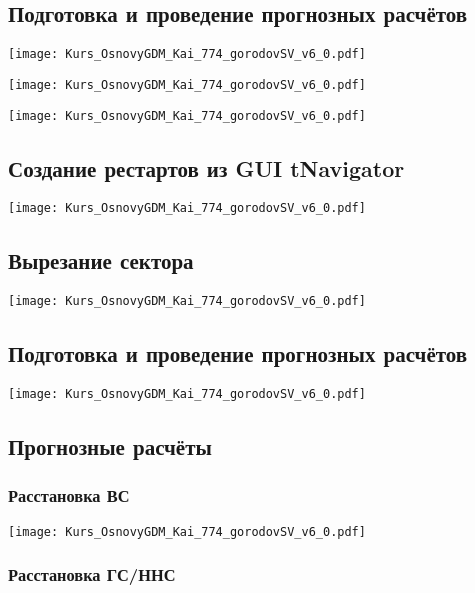 \documentclass[main.tex]{subfiles}
\begin{document}
\subsection{Подготовка и проведение прогнозных расчётов}

\texttt{[image: Kurs\_OsnovyGDM\_Kai\_774\_gorodovSV\_v6\_0.pdf]}

\texttt{[image: Kurs\_OsnovyGDM\_Kai\_774\_gorodovSV\_v6\_0.pdf]}

\texttt{[image: Kurs\_OsnovyGDM\_Kai\_774\_gorodovSV\_v6\_0.pdf]}

\subsection{Создание рестартов из GUI tNavigator}

\texttt{[image: Kurs\_OsnovyGDM\_Kai\_774\_gorodovSV\_v6\_0.pdf]}

\subsection{Вырезание сектора}

\texttt{[image: Kurs\_OsnovyGDM\_Kai\_774\_gorodovSV\_v6\_0.pdf]}

\subsection{Подготовка и проведение прогнозных расчётов}

\texttt{[image: Kurs\_OsnovyGDM\_Kai\_774\_gorodovSV\_v6\_0.pdf]}

\subsection{Прогнозные расчёты}

\subsubsection{Расстановка ВС}

\texttt{[image: Kurs\_OsnovyGDM\_Kai\_774\_gorodovSV\_v6\_0.pdf]}

\subsubsection{Расстановка ГС/ННС}
\end{document}
